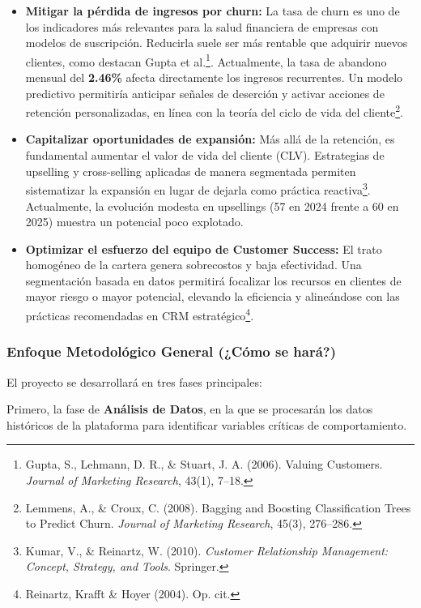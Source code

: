 \begin{itemize}
    \item \textbf{Mitigar la pérdida de ingresos por churn:} La tasa de churn es uno de los indicadores más relevantes para la salud financiera de empresas con modelos de suscripción. Reducirla suele ser más rentable que adquirir nuevos clientes, como destacan Gupta et al.\footnote{Gupta, S., Lehmann, D. R., \& Stuart, J. A. (2006). Valuing Customers. \textit{Journal of Marketing Research}, 43(1), 7–18.}. Actualmente, la tasa de abandono mensual del \textbf{2.46\%} afecta directamente los ingresos recurrentes. Un modelo predictivo permitiría anticipar señales de deserción y activar acciones de retención personalizadas, en línea con la teoría del ciclo de vida del cliente\footnote{Lemmens, A., \& Croux, C. (2008). Bagging and Boosting Classification Trees to Predict Churn. \textit{Journal of Marketing Research}, 45(3), 276–286.}.
    
    \item \textbf{Capitalizar oportunidades de expansión:} Más allá de la retención, es fundamental aumentar el valor de vida del cliente (CLV). Estrategias de upselling y cross-selling aplicadas de manera segmentada permiten sistematizar la expansión en lugar de dejarla como práctica reactiva\footnote{Kumar, V., \& Reinartz, W. (2010). \textit{Customer Relationship Management: Concept, Strategy, and Tools}. Springer.}. Actualmente, la evolución modesta en upsellings (57 en 2024 frente a 60 en 2025) muestra un potencial poco explotado.  

    \item \textbf{Optimizar el esfuerzo del equipo de Customer Success:} El trato homogéneo de la cartera genera sobrecostos y baja efectividad. Una segmentación basada en datos permitirá focalizar los recursos en clientes de mayor riesgo o mayor potencial, elevando la eficiencia y alineándose con las prácticas recomendadas en CRM estratégico\footnote{Reinartz, Krafft \& Hoyer (2004). Op. cit.}.
\end{itemize}

\subsubsection{Enfoque Metodológico General (¿Cómo se hará?)}

El proyecto se desarrollará en tres fases principales:  

Primero, la fase de \textbf{Análisis de Datos}, en la que se procesarán los datos históricos de la plataforma para identificar variables críticas de comportamiento.  

